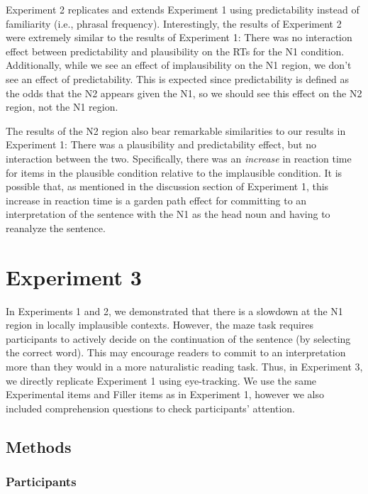 \documentclass[
  12pt,
  letterpaper,
]{scrreport}
\begin{document}
Experiment 2 replicates and extends Experiment 1 using predictability
instead of familiarity (i.e., phrasal frequency). Interestingly, the
results of Experiment 2 were extremely similar to the results of
Experiment 1: There was no interaction effect between predictability and
plausibility on the RTs for the N1 condition. Additionally, while we see
an effect of implausibility on the N1 region, we don't see an effect of
predictability. This is expected since predictability is defined as the
odds that the N2 appears given the N1, so we should see this effect on
the N2 region, not the N1 region.

The results of the N2 region also bear remarkable similarities to our
results in Experiment 1: There was a plausibility and predictability
effect, but no interaction between the two. Specifically, there was an
\emph{increase} in reaction time for items in the plausible condition
relative to the implausible condition. It is possible that, as mentioned
in the discussion section of Experiment 1, this increase in reaction
time is a garden path effect for committing to an interpretation of the
sentence with the N1 as the head noun and having to reanalyze the
sentence.

\section{Experiment 3}\label{experiment-3}

In Experiments 1 and 2, we demonstrated that there is a slowdown at the
N1 region in locally implausible contexts. However, the maze task
requires participants to actively decide on the continuation of the
sentence (by selecting the correct word). This may encourage readers to
commit to an interpretation more than they would in a more naturalistic
reading task. Thus, in Experiment 3, we directly replicate Experiment 1
using eye-tracking. We use the same Experimental items and Filler items
as in Experiment 1, however we also included comprehension questions to
check participants' attention.

\subsection{Methods}\label{methods-2}

\subsubsection{Participants}\label{participants-2}
\end{document}
